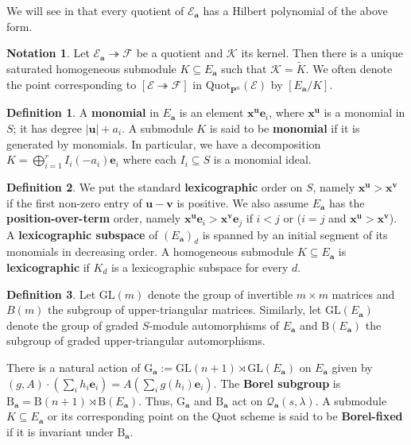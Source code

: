 \documentclass[leqno,11pt,a4paper]{amsart}
\theoremstyle{definition}
\newtheorem{notation}[notation]{Notation}
\newtheorem{definition}[definition]{Definition}
\numberwithin{equation}{section}
\newcommand{\bfa}{\mathbf{a}}
\newcommand{\GL}{\mathrm{GL}}
\newcommand{\Quot}{\mathrm{Quot}}
\newcommand{\PP}{\mathbf{P}}
\newcommand{\bfx}{\boldsymbol{x}}
\newcommand{\bfu}{\boldsymbol{u}}
\newcommand{\bfv}{\boldsymbol{v}}
\newcommand{\bfe}{\mathbf{e}}
\newcommand{\EE}{\mathscr{E}}
\newcommand{\FF}{\mathscr{F}}
\newcommand{\KK}{\mathscr{K}}
\newcommand{\QQ}{\mathcal{Q}}
\begin{document}
We will see in  that every quotient of $\EE_{\bfa}$ has a Hilbert polynomial of the above form.

\begin{notation} Let $\EE_{\bfa} \twoheadrightarrow \FF$ be a quotient and $\KK$ its kernel. 
Then there is a unique saturated homogeneous submodule $K\subseteq E_{\mathbf a}$ such that $\KK = \widetilde{K}$. 
We often denote the point corresponding to $[\EE \twoheadrightarrow \FF]$ in $\Quot_{\PP^n}(\EE)$ by $[E_{\bfa}/K]$.
\end{notation}

\begin{definition} 
A \textbf{monomial} in $E_{\bfa}$ is an element $\bfx^{\bfu}\bfe_i$, where $\bfx^{\bfu}$ is a monomial in $S$; it has degree $|\bfu| + a_i$. 
A submodule $K$ is said to be \textbf{monomial} if it is generated by monomials. In particular, we have a decomposition $K = \bigoplus_{i=1}^r I_i(-a_i)\bfe_i$ where each $I_i \subseteq S$ is a monomial ideal.
\end{definition}


\begin{definition} 
We put the standard \textbf{lexicographic} order on $S$, namely $\bfx^{\bfu} > \bfx^{\bfv}$ if the first non-zero entry of $\bfu-\bfv$ is positive. 
We also assume $E_{\bfa}$ has the \textbf{position-over-term} order, namely $\bfx^{\bfu}\bfe_i > \bfx^{\bfv}\bfe_j$ if $i < j$ or  ($i =j$ and $\bfx^{\bfu} > \bfx^{\bfv}$). 
A \textbf{lexicographic subspace} of $(E_{\mathbf a})_d$ is spanned by an initial segment of its monomials in decreasing order. 
A homogeneous submodule $K\subseteq E_{\bfa}$ is \textbf{lexicographic} if $K_d$ is a lexicographic subspace for every $d$. 
\end{definition}



\begin{definition} 
Let $\GL(m)$ denote the group of invertible $m\times m$ matrices and $B(m)$ the subgroup of upper-triangular matrices. 
Similarly, let $\GL(E_{\mathbf a})$ denote the group of graded $S$-module automorphisms of $E_{\mathbf a}$ and $\mathrm{B}(E_{\bfa})$ the subgroup of graded upper-triangular automorphisms. 

There is a natural action of $\mathrm{G}_{\bfa} := \GL(n+1) \rtimes \GL(E_{\bfa})$ on $E_{\bfa}$ given by $(g,A)\cdot\left(\sum_i h_i \bfe_i \right) = A\left(\sum_i g(h_i)\bfe_i \right)$.
The \textbf{Borel subgroup} is $\mathrm{B}_{\bfa}=\mathrm{B}(n+1)\rtimes\mathrm{B}(E_{\bfa})$. Thus, $\mathrm{G}_{\bfa}$ and $\mathrm{B}_{\bfa}$ act on $\QQ_{\mathbf a}(s,\lambda)$. 
A submodule $K\subseteq E_{\bfa}$ or its corresponding point on the Quot scheme is said to be \textbf{Borel-fixed} if it is invariant under $\mathrm{B}_{\bfa}$.
\end{definition}
\end{document}
